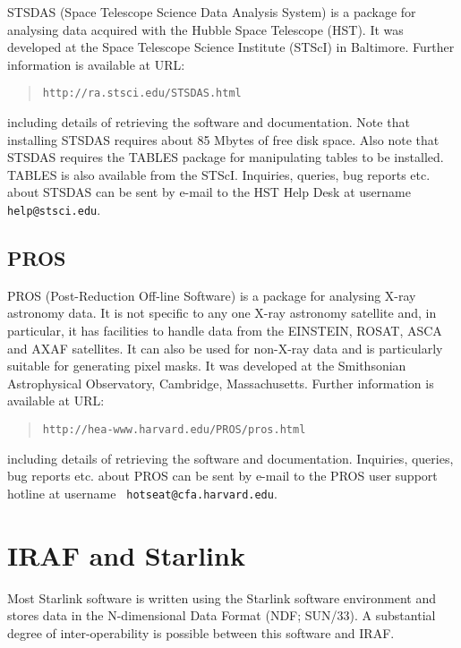 \documentclass[twoside,11pt]{article}
\newcommand{\htmladdnormallink}[2]{#1}
\newcommand{\xref}[3]{#1}
\newcommand{\xlabel}[1]{}
\begin{document}
STSDAS (Space Telescope Science Data Analysis System) is a package
for analysing data  acquired with the Hubble Space Telescope (HST).
It was developed at the Space Telescope Science Institute (STScI) in
Baltimore.  Further information is available at URL:

\begin{quote}
\htmladdnormallink{ {\tt http://ra.stsci.edu/STSDAS.html} }
   {http://ra.stsci.edu/STSDAS.html}
\end{quote}

including details of retrieving the software and documentation.  Note
that installing STSDAS requires about 85 Mbytes of free disk space.
Also note that STSDAS requires the TABLES package for manipulating
tables to be installed.  TABLES is also available from the STScI.
Inquiries, queries, bug reports etc. about STSDAS can be sent by e-mail
to the HST Help Desk at username {\tt help@stsci.edu}.

\subsection{PROS}

PROS (Post-Reduction Off-line Software) is a package for analysing
X-ray astronomy data.  It is not specific to any one X-ray astronomy
satellite and, in particular, it has facilities to handle data from
the EINSTEIN, ROSAT, ASCA and AXAF satellites.  It can also be used
for non-X-ray data and is particularly suitable for generating pixel
masks.  It was developed at the Smithsonian Astrophysical Observatory,
Cambridge, Massachusetts.  Further information is available at URL:

\begin{quote}
\htmladdnormallink{ {\tt http://hea-www.harvard.edu/PROS/pros.html} }
   {http://hea-www.harvard.edu/PROS/pros.html}
\end{quote}

including details of retrieving the software and documentation.
Inquiries, queries, bug reports etc. about PROS can be sent by e-mail
to the PROS user support hotline at username {\tt
hotseat@cfa.harvard.edu}.


\section{\xlabel{IRAFSTAR}\label{IRAFSTAR}IRAF and Starlink}

Most Starlink software is written using the Starlink software environment
and stores data in the N-dimensional Data Format (NDF;
\xref{SUN/33}{sun33}{}\cite{SUN33}).  A substantial degree of
inter-operability is possible between this software and IRAF.  
\end{document}
